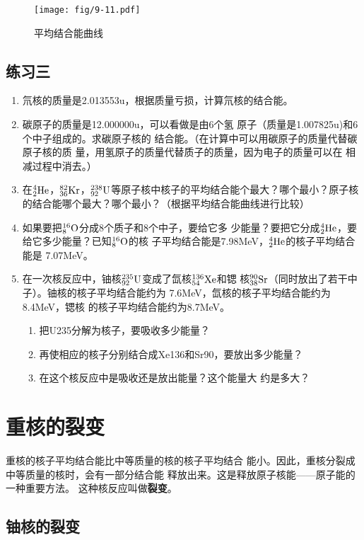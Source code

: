 \begin{figure}[htp]
\centering
\texttt{[image: fig/9-11.pdf]}
\caption{平均结合能曲线}
\end{figure}


\subsection*{练习三}

\begin{enumerate}
    \item 氘核的质量是2.013553u，根据质量亏损，计算氘核的结合能。
    \item 碳原子的质量是12.000000u，可以看做是由6个氢
原子（质量是1.007825u)和6个中子组成的。求碳原子核的
结合能。（在计算中可以用碳原子的质量代替碳原子核的质
量，用氢原子的质量代替质子的质量，因为电子的质量可以在
相减过程中消去。）
\item  在$\atom{He}{4}{2}$，$\atom{Kr}{82}{36}$，$\atom{U}{238}{92}$等原子核中核子的平均结合能个最大？哪个最小？原子核的结合能哪个最大？哪个最小？（根据平均结合能曲线进行比较）
\item 如果要把$\atom{O}{16}{8}$分成8个质子和8个中子，要给它多
少能量？要把它分成$\atom{He}{4}{2}$，要给它多少能量？已知$\atom{O}{16}{8}$的核
子平均结合能是7.98MeV，$\atom{He}{4}{2}$的核子平均结合能是
7.07MeV。
\item 在一次核反应中，铀核$\atom{U}{235}{92}$变成了氙核$\atom{Xe}{136}{54}$和锶
核$\atom{Sr}{90}{38}$（同时放出了若干中子）。铀核的核子平均结合能约为
7.6MeV，氙核的核子平均结合能约为8.4MeV，锶核
的核子平均结合能约为8.7MeV。
\begin{enumerate}
    \item 把U235分解为核子，要吸收多少能量？
    \item 再使相应的核子分别结合成Xe136和Sr90，要放出多少能量？
    \item 在这个核反应中是吸收还是放出能量？这个能量大
约是多大？
\end{enumerate}
\end{enumerate}


\section{重核的裂变}
重核的核子平均结合能比中等质量的核的核子平均结合
能小。因此，重核分裂成中等质量的核时，会有一部分结合能
释放出来。这是释放原子核能——原子能的一种重要方法。
这种核反应叫做\textbf{裂变}。

\subsection{铀核的裂变}

